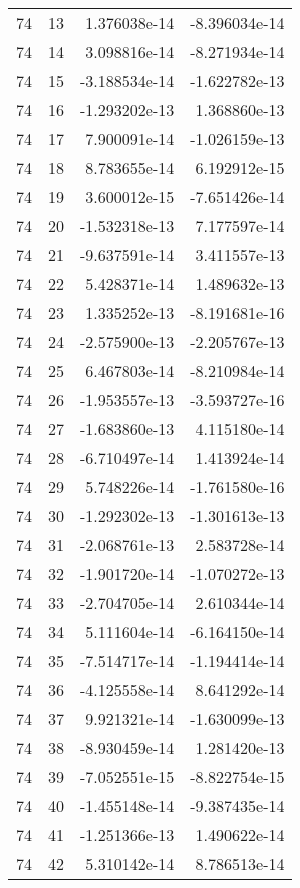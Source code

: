 \begin{tabular}{rrrr}
  74 &   13 &  1.376038e-14 & -8.396034e-14 \\
  74 &   14 &  3.098816e-14 & -8.271934e-14 \\
  74 &   15 & -3.188534e-14 & -1.622782e-13 \\
  74 &   16 & -1.293202e-13 &  1.368860e-13 \\
  74 &   17 &  7.900091e-14 & -1.026159e-13 \\
  74 &   18 &  8.783655e-14 &  6.192912e-15 \\
  74 &   19 &  3.600012e-15 & -7.651426e-14 \\
  74 &   20 & -1.532318e-13 &  7.177597e-14 \\
  74 &   21 & -9.637591e-14 &  3.411557e-13 \\
  74 &   22 &  5.428371e-14 &  1.489632e-13 \\
  74 &   23 &  1.335252e-13 & -8.191681e-16 \\
  74 &   24 & -2.575900e-13 & -2.205767e-13 \\
  74 &   25 &  6.467803e-14 & -8.210984e-14 \\
  74 &   26 & -1.953557e-13 & -3.593727e-16 \\
  74 &   27 & -1.683860e-13 &  4.115180e-14 \\
  74 &   28 & -6.710497e-14 &  1.413924e-14 \\
  74 &   29 &  5.748226e-14 & -1.761580e-16 \\
  74 &   30 & -1.292302e-13 & -1.301613e-13 \\
  74 &   31 & -2.068761e-13 &  2.583728e-14 \\
  74 &   32 & -1.901720e-14 & -1.070272e-13 \\
  74 &   33 & -2.704705e-14 &  2.610344e-14 \\
  74 &   34 &  5.111604e-14 & -6.164150e-14 \\
  74 &   35 & -7.514717e-14 & -1.194414e-14 \\
  74 &   36 & -4.125558e-14 &  8.641292e-14 \\
  74 &   37 &  9.921321e-14 & -1.630099e-13 \\
  74 &   38 & -8.930459e-14 &  1.281420e-13 \\
  74 &   39 & -7.052551e-15 & -8.822754e-15 \\
  74 &   40 & -1.455148e-14 & -9.387435e-14 \\
  74 &   41 & -1.251366e-13 &  1.490622e-14 \\
  74 &   42 &  5.310142e-14 &  8.786513e-14 \\

\end{tabular}
